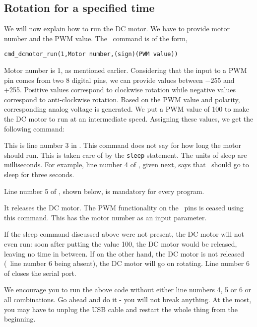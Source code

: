 \subsection{Rotation for a specified time}
\label{sec:dc-both}
We will now explain how to run the DC motor.  We have to provide motor
number and the PWM value.  The \scilab\ command is of the form,
\begin{lstlisting}[style=nonumbers]
  cmd_dcmotor_run(1,Motor number,(sign)(PWM value))
\end{lstlisting}
Motor number is 1, as mentioned earlier.  Considering that the input
to a PWM pin comes from two 8 digital pins, we can provide values
between $-255$ and +255. Positive values correspond to clockwise
rotation while negative values correspond to anti-clockwise rotation.
Based on the PWM value and polarity, corresponding analog voltage is
generated.  We put a PWM value of 100 to make the DC motor to
run at an intermediate speed.  Assigning these values, we get the
following command:

This is line number 3 in .  This command
does not say for how long the motor should run.  This is taken care of
by the {\tt sleep} statement.  The units of sleep are milliseconds.
For example, line number 4 of , given next,
says that \scilab\ should go to sleep for three seconds.


Line number 5 of , shown below, is mandatory
for every program.

It releases the DC motor.  The PWM functionality on the \arduino\ pins
is ceased using this command.  This has the motor number as an input
parameter.

If the sleep command discussed above were not present, the DC motor
will not even run: soon after putting the value 100, the DC motor
would be released, leaving no time in between.  If on the other hand,
the DC motor is not released (\ie\ line number 6 being absent), the DC
motor will go on rotating.  Line number 6 of 
closes the serial port.

We encourage you to run the above code without either line numbers 4,
5 or 6 or all combinations.  Go ahead and do it - you will not break
anything.  At the most, you may have to unplug the USB cable and
restart the whole thing from the beginning.

